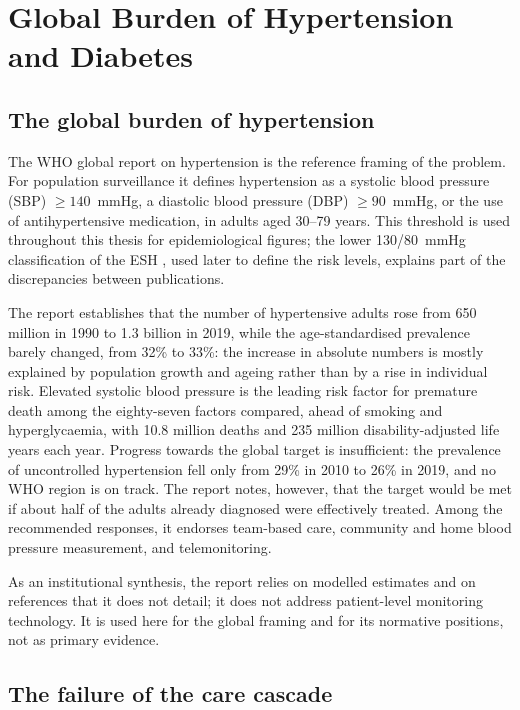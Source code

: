 \documentclass[12pt,a4paper,oneside]{report}
\begin{document}
\section{Global Burden of Hypertension and Diabetes}\label{sec:burden}\label{sec:transition}\label{sec:hta-burden}

\subsection{The global burden of hypertension}

The WHO global report on hypertension \parencite{who2023hypertension} is the reference framing of the problem. For population surveillance it defines hypertension as a systolic blood pressure (SBP) $\geq 140$~mmHg, a diastolic blood pressure (DBP) $\geq 90$~mmHg, or the use of antihypertensive medication, in adults aged 30--79 years. This threshold is used throughout this thesis for epidemiological figures; the lower 130/80~mmHg classification of the ESH \parencite{mancia2023}, used later to define the risk levels, explains part of the discrepancies between publications.

The report establishes that the number of hypertensive adults rose from 650 million in 1990 to 1.3 billion in 2019, while the age-standardised prevalence barely changed, from 32\% to 33\%: the increase in absolute numbers is mostly explained by population growth and ageing rather than by a rise in individual risk. Elevated systolic blood pressure is the leading risk factor for premature death among the eighty-seven factors compared, ahead of smoking and hyperglycaemia, with 10.8 million deaths and 235 million disability-adjusted life years each year. Progress towards the global target is insufficient: the prevalence of uncontrolled hypertension fell only from 29\% in 2010 to 26\% in 2019, and no WHO region is on track. The report notes, however, that the target would be met if about half of the adults already diagnosed were effectively treated. Among the recommended responses, it endorses team-based care, community and home blood pressure measurement, and telemonitoring.

As an institutional synthesis, the report relies on modelled estimates and on references that it does not detail; it does not address patient-level monitoring technology. It is used here for the global framing and for its normative positions, not as primary evidence.

\subsection{The failure of the care cascade}\label{sec:cascade}
\end{document}
